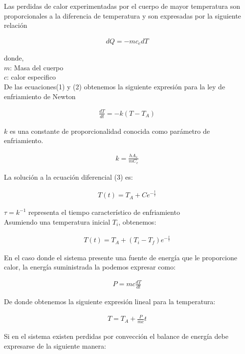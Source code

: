 \documentclass{article}
\begin{document}
Las perdidas de calor experimentadas por el cuerpo de mayor temperatura son proporcionales a la diferencia de temperatura y son expresadas por la siguiente relación 

\begin{align}
    dQ = -mc_edT
\end{align}

donde, \\ 
$m$: Masa del cuerpo \\ 
$c$: calor especifico \\ 
De las ecuaciones(1) y (2) obtenemos la siguiente expresión para la ley de enfriamiento de Newton 

\begin{align}
    \frac{dT}{dt} = -k(T-T_A)
\end{align}

$k$ es una constante de proporcionalidad conocida como parámetro de enfriamiento.

\begin{align}
    k = \frac{hA_s}{mC_e}
\end{align}

La solución a la ecuación diferencial (3) es: 

\begin{align}
    T(t) = T_A + Ce^{-\frac{t}{\tau}}
\end{align}

$\tau = k^{-1}$ representa el tiempo característico de enfriamiento \\ 

Asumiendo una temperatura inicial $T_i$, obtenemos: 

\begin{align}
    T(t) = T_A + (T_i-T_f)e^{-\frac{t}{\tau}}
\end{align}

En el caso donde el sistema presente una fuente de energía que le proporcione calor, la energía suministrada la podemos expresar como: 

\begin{align}
    P = mc\frac{dT}{dt}
\end{align}

De donde obtenemos la siguiente expresión lineal para la temperatura: 

\begin{align}
    T =  T_A + \frac{P}{mc}t
\end{align}

Si en el sistema existen perdidas por convección el balance de energía debe expresarse de la siguiente manera: 
\end{document}
